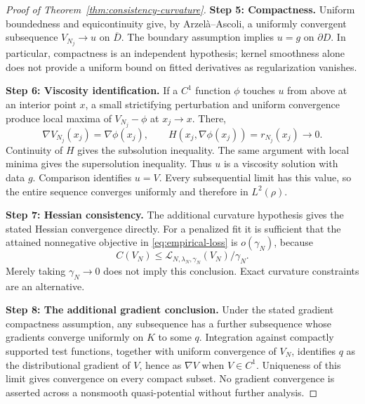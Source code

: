\documentclass[11pt]{article}
\theoremstyle{plain}      %
\theoremstyle{definition} %
\begin{document}
\begin{proof}[Proof of Theorem~\ref{thm:consistency-curvature}]
\medskip\noindent\textbf{Step 5: Compactness.}
Uniform boundedness and equicontinuity give, by Arzel\`a--Ascoli, a uniformly convergent subsequence $V_{N_j}\to u$ on $\overline D$. The boundary assumption implies $u=g$ on $\partial D$. In particular, compactness is an independent hypothesis; kernel smoothness alone does not provide a uniform bound on fitted derivatives as regularization vanishes.

\medskip\noindent\textbf{Step 6: Viscosity identification.}
If a $C^1$ function $\phi$ touches $u$ from above at an interior point $x$, a small strictifying perturbation and uniform convergence produce local maxima of $V_{N_j}-\phi$ at $x_j\to x$. There,
\[
 \nabla V_{N_j}(x_j)=\nabla\phi(x_j),\qquad
 H(x_j,\nabla\phi(x_j))=r_{N_j}(x_j)\to0.
\]
Continuity of $H$ gives the subsolution inequality. The same argument with local minima gives the supersolution inequality. Thus $u$ is a viscosity solution with data $g$. Comparison identifies $u=V$. Every subsequential limit has this value, so the entire sequence converges uniformly and therefore in $L^2(\rho)$.

\medskip\noindent\textbf{Step 7: Hessian consistency.}
The additional curvature hypothesis gives the stated Hessian convergence directly. For a penalized fit it is sufficient that the attained nonnegative objective in \eqref{eq:empirical-loss} is $o(\gamma_N)$, because
\[
 C(V_N)\leq\mathcal L_{N,\lambda_N,\gamma_N}(V_N)/\gamma_N.
\]
Merely taking $\gamma_N\to0$ does not imply this conclusion. Exact curvature constraints are an alternative.

\medskip\noindent\textbf{Step 8: The additional gradient conclusion.}
Under the stated gradient compactness assumption, any subsequence has a further subsequence whose gradients converge uniformly on $K$ to some $q$. Integration against compactly supported test functions, together with uniform convergence of $V_N$, identifies $q$ as the distributional gradient of $V$, hence as $\nabla V$ when $V\in C^1$. Uniqueness of this limit gives convergence on every compact subset. No gradient convergence is asserted across a nonsmooth quasi-potential without further analysis.
\end{proof}
\end{document}
